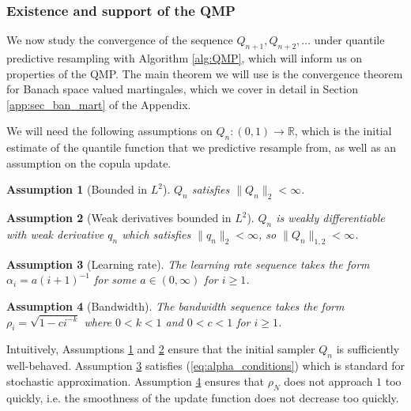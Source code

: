 \documentclass[11pt,a4paper]{article}
\newtheorem{assumption}{Assumption}%
\newcommand{\R}{\mathbb{R}}
\begin{document}
\subsubsection{Existence and support of the QMP}
 We now study the convergence of the sequence $Q_{n+1}, Q_{n+2},\ldots$ under quantile predictive resampling with {Algorithm \ref{alg:QMP}}, which will inform us on properties of the QMP. The main theorem we will use is the  convergence theorem for Banach space valued martingales, which we cover in detail in Section \ref{app:sec_ban_mart} of the Appendix.
 
We will need the following assumptions on $Q_n:(0,1)\to \R$, which is the initial estimate of the quantile function that we predictive resample from, as well as an assumption on the copula update.

\begin{assumption}[Bounded in $L^2$]\label{as:L2}
    $Q_n$ satisfies $\|Q_n\|_2 < \infty$.
\end{assumption}
\begin{assumption}[Weak derivatives bounded in $L^2$]\label{as:weak_deriv} 
$Q_n$ is weakly differentiable with weak derivative $q_n$ which satisfies  $\|q_n\|_2 < \infty$, so $\|Q_n\|_{1,2} <\infty$.
\end{assumption}
\begin{assumption}[Learning rate]\label{as:alpha}
    The learning rate sequence takes the form $\alpha_i= a(i+1)^{-1}$ for some $a \in (0,\infty)$ for $i \geq 1$.
\end{assumption}
\begin{assumption}[Bandwidth]\label{as:bandwidth}
    The bandwidth sequence takes the form  $\rho_i =\sqrt{1-ci^{-k}}$  where $0 < k < 1$ and $0 < c< 1$ for $i \geq 1$. 
\end{assumption}

Intuitively, {Assumptions \ref{as:L2}} and {\ref{as:weak_deriv}} ensure that the initial sampler $Q_n$ is sufficiently well-behaved. {Assumption \ref{as:alpha}} satisfies (\ref{eq:alpha_conditions}) which is standard for stochastic approximation. {Assumption \ref{as:bandwidth}} ensures that $\rho_N$ does not approach $1$ too quickly, i.e. the smoothness of the update function does not decrease too quickly.
 
\end{document}
